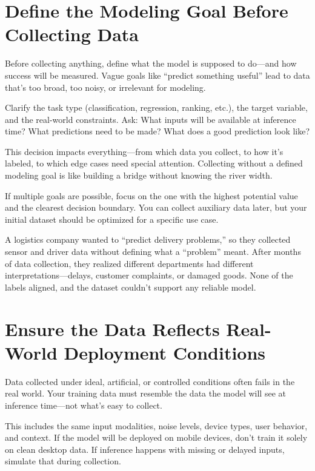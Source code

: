 \documentclass[12pt,openany, draft]{book}
\begin{document}
\section{Define the Modeling Goal Before Collecting Data}

Before collecting anything, define what the model is supposed to do—and how success will be measured. Vague goals like “predict something useful” lead to data that's too broad, too noisy, or irrelevant for modeling.
\newline

Clarify the task type (classification, regression, ranking, etc.), the target variable, and the real-world constraints. Ask: What inputs will be available at inference time? What predictions need to be made? What does a good prediction look like?
\newline

This decision impacts everything—from which data you collect, to how it’s labeled, to which edge cases need special attention. Collecting without a defined modeling goal is like building a bridge without knowing the river width.
\newline

If multiple goals are possible, focus on the one with the highest potential value and the clearest decision boundary. You can collect auxiliary data later, but your initial dataset should be optimized for a specific use case.

\begin{examplebox}
A logistics company wanted to “predict delivery problems,” so they collected sensor and driver data without defining what a “problem” meant. After months of data collection, they realized different departments had different interpretations—delays, customer complaints, or damaged goods. None of the labels aligned, and the dataset couldn’t support any reliable model.
\end{examplebox}



\section{Ensure the Data Reflects Real-World Deployment Conditions}

Data collected under ideal, artificial, or controlled conditions often fails in the real world. Your training data must resemble the data the model will see at inference time—not what’s easy to collect.

This includes the same input modalities, noise levels, device types, user behavior, and context. If the model will be deployed on mobile devices, don’t train it solely on clean desktop data. If inference happens with missing or delayed inputs, simulate that during collection.
\end{document}

